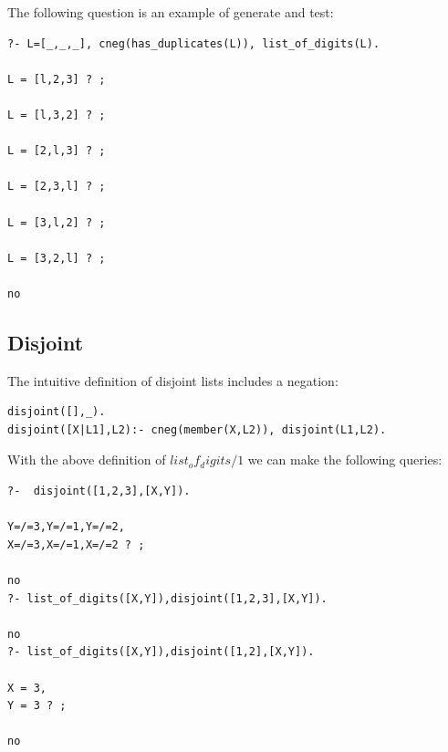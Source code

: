 \documentclass{tlp}
\begin{document}
The following question is an example of generate and test:
\begin{small}
\begin{verbatim}
?- L=[_,_,_], cneg(has_duplicates(L)), list_of_digits(L).

L = [l,2,3] ? ;

L = [l,3,2] ? ;

L = [2,l,3] ? ;

L = [2,3,l] ? ;

L = [3,l,2] ? ;

L = [3,2,l] ? ;

no
\end{verbatim}
\end{small}

\subsection*{Disjoint}

The intuitive definition of disjoint lists includes a negation:
\begin{small}
\begin{verbatim}
disjoint([],_).
disjoint([X|L1],L2):- cneg(member(X,L2)), disjoint(L1,L2).
\end{verbatim}
\end{small}

With the above definition of $list_of_digits/1$ we can make the following
queries: 
\begin{small}
\begin{verbatim}
?-  disjoint([1,2,3],[X,Y]).

Y=/=3,Y=/=1,Y=/=2,
X=/=3,X=/=1,X=/=2 ? ;

no
?- list_of_digits([X,Y]),disjoint([1,2,3],[X,Y]).

no
?- list_of_digits([X,Y]),disjoint([1,2],[X,Y]).

X = 3,
Y = 3 ? ;

no
\end{verbatim}
\end{small}
\end{document}
